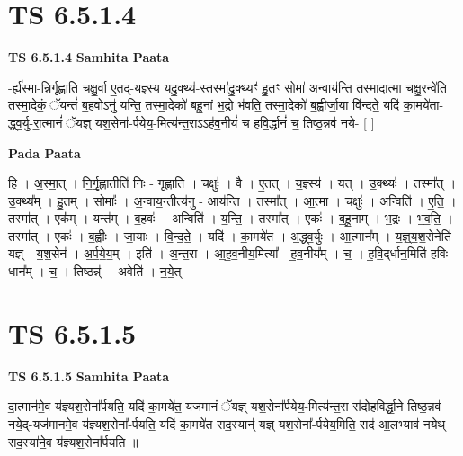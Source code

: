 \documentclass[17pt]{extarticle}
\begin{document}

\section{ TS 6.5.1.4 }

\textbf{TS 6.5.1.4 } \newline
\textbf{Samhita Paata} \newline

-र्ह्य॑स्मा-न्निर्गृ॒ह्णाति॒ चक्षु॒र्वा ए॒तद्-य॒ज्ञ्स्य॒ यदु॒क्थ्य॑-स्तस्मा॑दु॒क्थ्यꣳ॑ हु॒तꣳ सोमा॑ अ॒न्वाय॑न्ति॒ तस्मा॑दा॒त्मा चक्षु॒रन्वे॑ति॒ तस्मा॒देकं॒ ॅयन्तं॑ ब॒हवोऽनु॑ यन्ति॒ तस्मा॒देको॑ बहू॒नां भ॒द्रो भ॑वति॒ तस्मा॒देको॑ ब॒ह्वीर्जा॒या वि॑न्दते॒ यदि॑ का॒मये॑ता-द्ध्व॒र्यु-रा॒त्मानं॑ ॅयज्ञ् यश॒सेना᳚-र्पयेय॒-मित्य॑न्त॒राऽऽह॑व॒नीयं॑ च हवि॒र्द्धानं॑ च॒ तिष्ठ॒न्नव॑ नये- [  ] \newline

\textbf{Pada Paata} \newline

हि । अ॒स्मा॒त् । नि॒र्गृ॒ह्णातीति॑ निः - गृ॒ह्णाति॑ । चक्षुः॑ । वै । ए॒तत् । य॒ज्ञ्स्य॑ । यत् । उ॒क्थ्यः॑ । तस्मा᳚त् । उ॒क्थ्य᳚म् । हु॒तम् । सोमाः᳚ । अ॒न्वाय॒न्तीत्य॑नु - आय॑न्ति । तस्मा᳚त् । आ॒त्मा । चक्षुः॑ । अन्विति॑ । ए॒ति॒ । तस्मा᳚त् । एक᳚म् । यन्त᳚म् । ब॒हवः॑ । अन्विति॑ । य॒न्ति॒ । तस्मा᳚त् । एकः॑ । ब॒हू॒नाम् । भ॒द्रः । भ॒व॒ति॒ । तस्मा᳚त् । एकः॑ । ब॒ह्वीः । जा॒याः । वि॒न्द॒ते॒ । यदि॑ । का॒मये॑त । अ॒द्ध्व॒र्युः । आ॒त्मान᳚म् । य॒ज्ञ्॒य॒श॒सेनेति॑ यज्ञ् - य॒श॒सेन॑ । अ॒र्प॒ये॒य॒म् । इति॑ । अ॒न्त॒रा । आ॒ह॒व॒नीय॒मित्या᳚ - ह॒व॒नीय᳚म् । च॒ । ह॒वि॒द्‌र्धान॒मिति॑ हविः - धान᳚म् । च॒ । तिष्ठन्न्॑ । अवेति॑ । न॒ये॒त् ।  \newline





\section{ TS 6.5.1.5 }

\textbf{TS 6.5.1.5 } \newline
\textbf{Samhita Paata} \newline

दा॒त्मान॑मे॒व य॑ज्ञ्यश॒सेना᳚र्पयति॒ यदि॑ का॒मये॑त॒ यज॑मानं ॅयज्ञ् यश॒सेना᳚र्पयेय॒-मित्य॑न्त॒रा स॑दोहविर्द्धा॒ने तिष्ठ॒न्नव॑ नये॒द्-यज॑मानमे॒व य॑ज्ञ्यश॒सेना᳚-र्पयति॒ यदि॑ का॒मये॑त सद॒स्यान्॑ यज्ञ् यश॒सेना᳚-र्पयेय॒मिति॒ सद॑ आ॒लभ्याव॑ नयेथ् सद॒स्या॑ने॒व य॑ज्ञ्यश॒सेना᳚र्पयति ॥ \newline
\end{document}
